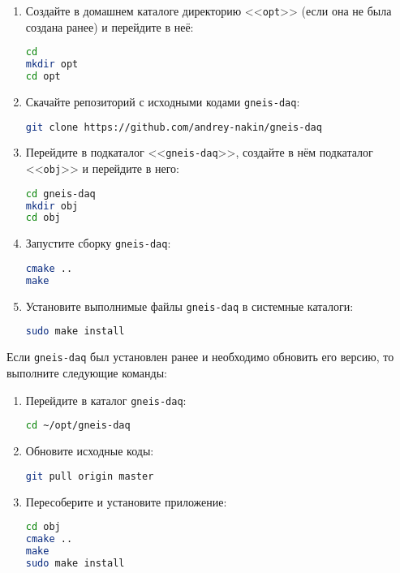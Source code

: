 \documentclass[12pt, a4paper, oneside, onecolumn]{book}
\newcommand{\GD}{{\tt gneis-daq}}
\newcommand{\DIRECTORY}[1]{<<{\tt #1}>>}
\begin{document}
\begin{enumerate}
\item Создайте в домашнем каталоге директорию \DIRECTORY{opt} (если она не была создана ранее) и перейдите в неё:

\begin{lstlisting}[language=bash]
cd
mkdir opt
cd opt
\end{lstlisting}

\item Скачайте репозиторий с исходными кодами \GD{}:

\begin{lstlisting}[language=bash]
git clone https://github.com/andrey-nakin/gneis-daq
\end{lstlisting}

\item Перейдите в подкаталог \DIRECTORY{gneis-daq}, создайте в нём подкаталог \DIRECTORY{obj} и перейдите в него:

\begin{lstlisting}[language=bash]
cd gneis-daq
mkdir obj
cd obj
\end{lstlisting}

\item Запустите сборку \GD{}:

\begin{lstlisting}[language=bash]
cmake ..
make
\end{lstlisting}

\item Установите выполнимые файлы \GD{} в системные каталоги{}:

\begin{lstlisting}[language=bash]
sudo make install
\end{lstlisting}

\end{enumerate}

Если \GD{} был установлен ранее и необходимо обновить его версию, то выполните следующие команды:

\begin{enumerate}
\item Перейдите в каталог \GD{}:

\begin{lstlisting}[language=bash]
cd ~/opt/gneis-daq
\end{lstlisting}

\item Обновите исходные коды:

\begin{lstlisting}[language=bash]
git pull origin master
\end{lstlisting}

\item Пересоберите и установите приложение:

\begin{lstlisting}[language=bash]
cd obj
cmake ..
make
sudo make install
\end{lstlisting}

\end{enumerate}
\end{document}
